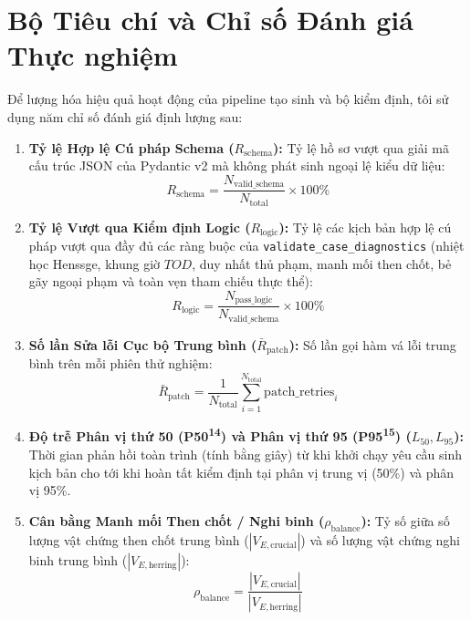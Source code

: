 \section{Bộ Tiêu chí và Chỉ số Đánh giá Thực nghiệm}
\label{sec:eval_metrics}

Để lượng hóa hiệu quả hoạt động của pipeline tạo sinh và bộ kiểm định, tôi sử dụng năm chỉ số đánh giá định lượng sau:

\begin{enumerate}[leftmargin=1.5cm]
    \item \textbf{Tỷ lệ Hợp lệ Cú pháp Schema ($R_{\text{schema}}$):} Tỷ lệ hồ sơ vượt qua giải mã cấu trúc JSON của Pydantic v2 mà không phát sinh ngoại lệ kiểu dữ liệu:
    \begin{equation}
        R_{\text{schema}} = \frac{N_{\text{valid\_schema}}}{N_{\text{total}}} \times 100\%
    \end{equation}
    
    \item \textbf{Tỷ lệ Vượt qua Kiểm định Logic ($R_{\text{logic}}$):} Tỷ lệ các kịch bản hợp lệ cú pháp vượt qua đầy đủ các ràng buộc của \texttt{validate\_case\_diagnostics} (nhiệt học Henssge, khung giờ $TOD$, duy nhất thủ phạm, manh mối then chốt, bẻ gãy ngoại phạm và toàn vẹn tham chiếu thực thể):
    \begin{equation}
        R_{\text{logic}} = \frac{N_{\text{pass\_logic}}}{N_{\text{valid\_schema}}} \times 100\%
    \end{equation}
    
    \item \textbf{Số lần Sửa lỗi Cục bộ Trung bình ($\bar{R}_{\text{patch}}$):} Số lần gọi hàm vá lỗi trung bình trên mỗi phiên thử nghiệm:
    \begin{equation}
        \bar{R}_{\text{patch}} = \frac{1}{N_{\text{total}}} \sum_{i=1}^{N_{\text{total}}} \text{patch\_retries}_i
    \end{equation}
    
    \item \textbf{Độ trễ Phân vị thứ 50 (P50\textsuperscript{14}) và Phân vị thứ 95 (P95\textsuperscript{15}) ($L_{50}, L_{95}$):} Thời gian phản hồi toàn trình (tính bằng giây) từ khi khởi chạy yêu cầu sinh kịch bản cho tới khi hoàn tất kiểm định tại phân vị trung vị (50\%) và phân vị 95\%.
    
    \item \textbf{Cân bằng Manh mối Then chốt / Nghi binh ($\rho_{\text{balance}}$):} Tỷ số giữa số lượng vật chứng then chốt trung bình ($|V_{E, \text{crucial}}|$) và số lượng vật chứng nghi binh trung bình ($|V_{E, \text{herring}}|$):
    \begin{equation}
        \rho_{\text{balance}} = \frac{|V_{E, \text{crucial}}|}{|V_{E, \text{herring}}|}
    \end{equation}
\end{enumerate}

